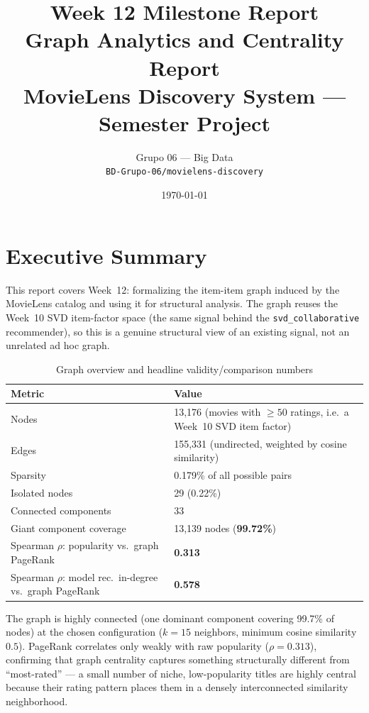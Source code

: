 \documentclass[12pt,a4paper]{article}
\title{
  \vspace{-1cm}
  \Large\textbf{Week 12 Milestone Report}\\[0.4em]
  \large Graph Analytics and Centrality Report\\[0.3em]
  \normalsize MovieLens Discovery System --- Semester Project
}
\author{
  Grupo 06 --- Big Data\\
  \texttt{BD-Grupo-06/movielens-discovery}
}
\date{\today}
\begin{document}

\maketitle
\thispagestyle{fancy}
\tableofcontents
\newpage

\section{Executive Summary}

This report covers Week~12: formalizing the item-item graph induced by the MovieLens catalog and
using it for structural analysis. The graph reuses the Week~10 SVD item-factor space (the same
signal behind the \texttt{svd\_collaborative} recommender), so this is a genuine structural view of
an existing signal, not an unrelated ad hoc graph.

\begin{table}[H]
\centering
\caption{Graph overview and headline validity/comparison numbers}
\begin{tabular}{ll}
\toprule
\textbf{Metric} & \textbf{Value} \\
\midrule
Nodes & 13,176 (movies with $\geq50$ ratings, i.e.\ a Week~10 SVD item factor) \\
Edges & 155,331 (undirected, weighted by cosine similarity) \\
Sparsity & 0.179\% of all possible pairs \\
Isolated nodes & 29 (0.22\%) \\
Connected components & 33 \\
Giant component coverage & 13,139 nodes (\textbf{99.72\%}) \\
Spearman $\rho$: popularity vs.\ graph PageRank & \textbf{0.313} \\
Spearman $\rho$: model rec.\ in-degree vs.\ graph PageRank & \textbf{0.578} \\
\bottomrule
\end{tabular}
\end{table}

The graph is highly connected (one dominant component covering 99.7\% of nodes) at the chosen
configuration ($k=15$ neighbors, minimum cosine similarity $0.5$). PageRank correlates only weakly
with raw popularity ($\rho=0.313$), confirming that graph centrality captures something
structurally different from ``most-rated'' --- a small number of niche, low-popularity titles are
highly central because their rating pattern places them in a densely interconnected similarity
neighborhood.
\end{document}
